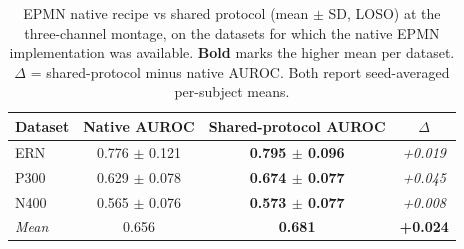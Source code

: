 \begin{table}[t]
\centering
\setlength{\tabcolsep}{6pt}
\caption{EPMN native recipe vs shared protocol (mean $\pm$ SD, LOSO) at the three-channel montage, on the datasets for which the native EPMN implementation was available. \textbf{Bold} marks the higher mean per dataset. $\Delta$ = shared-protocol minus native AUROC. Both report seed-averaged per-subject means.}
\label{sup:tab-epmn-native}
\begin{tabular}{lccc}
\toprule
Dataset & Native AUROC & Shared-protocol AUROC & $\Delta$ \\
\midrule
ERN & 0.776 $\pm$ 0.121 & \textbf{0.795 $\pm$ 0.096} & \textit{+0.019} \\
P300 & 0.629 $\pm$ 0.078 & \textbf{0.674 $\pm$ 0.077} & \textit{+0.045} \\
N400 & 0.565 $\pm$ 0.076 & \textbf{0.573 $\pm$ 0.077} & \textit{+0.008} \\
\midrule
\textit{Mean} & 0.656 & \textbf{0.681} & \textbf{+0.024} \\
\bottomrule
\end{tabular}
\end{table}
